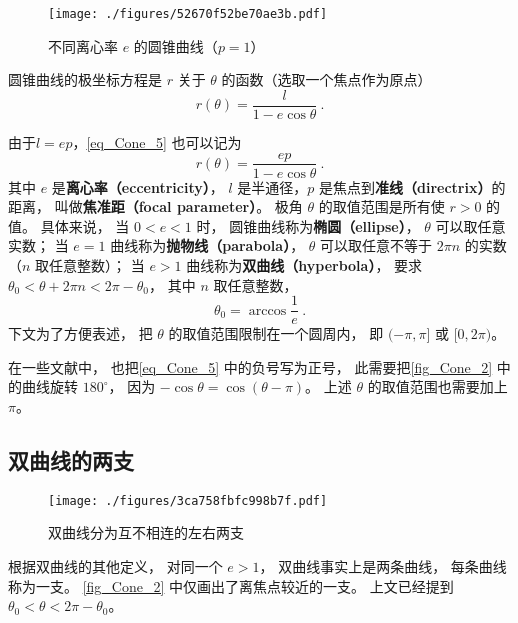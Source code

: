 

\begin{figure}[ht]
\centering
\texttt{[image: ./figures/52670f52be70ae3b.pdf]}
\caption{不同离心率 $e$ 的圆锥曲线（$p = 1$）} \label{fig_Cone_2}
\end{figure}

圆锥曲线的极坐标方程是 $r$ 关于 $\theta$ 的函数（选取一个焦点作为原点）
\begin{equation}\label{eq_Cone_5}
r(\theta)  = \frac{l}{1 - e\cos \theta }~.
\end{equation}

由于$l=ep$，\autoref{eq_Cone_5} 也可以记为
\begin{equation}\label{eq_Cone_3}
r(\theta) = \frac{ep}{1 - e\cos \theta }~.
\end{equation}
其中 $e$ 是\textbf{离心率（eccentricity）}， $l$ 是半通径，$p$ 是焦点到\textbf{准线（directrix）}的距离， 叫做\textbf{焦准距（focal parameter）}。 极角 $\theta$ 的取值范围是所有使 $r>0$ 的值。 具体来说， 当 $0 < e < 1$ 时， 圆锥曲线称为\textbf{椭圆（ellipse）}， $\theta$ 可以取任意实数； 当 $e = 1$ 曲线称为\textbf{抛物线（parabola）}， $\theta$ 可以取任意不等于 $2\pi n$ 的实数（$n$ 取任意整数）； 当 $e > 1$ 曲线称为\textbf{双曲线（hyperbola）}， 要求 $\theta_0< \theta + 2\pi n < 2\pi-\theta_0$， 其中 $n$ 取任意整数，
\begin{equation}
\theta_0 = \arccos\frac{1}{e}~.
\end{equation}
下文为了方便表述， 把 $\theta$ 的取值范围限制在一个圆周内， 即 $(-\pi,\pi]$ 或 $[0, 2\pi)$。

在一些文献中， 也把\autoref{eq_Cone_5} 中的负号写为正号， 此需要把\autoref{fig_Cone_2} 中的曲线旋转 $180^\circ$， 因为 $-\cos\theta = \cos(\theta - \pi)$。 上述 $\theta$ 的取值范围也需要加上 $\pi$。

\subsection{双曲线的两支}
\begin{figure}[ht]
\centering
\texttt{[image: ./figures/3ca758fbfc998b7f.pdf]}
\caption{双曲线分为互不相连的左右两支} \label{fig_Cone_3}
\end{figure}
根据双曲线的其他定义， 对同一个 $e>1$， 双曲线事实上是两条曲线， 每条曲线称为一支。 \autoref{fig_Cone_2} 中仅画出了离焦点较近的一支。 上文已经提到 $\theta_0< \theta < 2\pi-\theta_0$。

